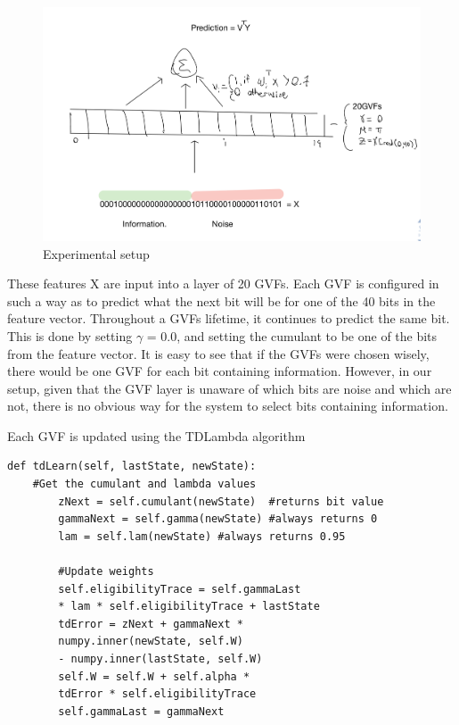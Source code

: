 \documentclass[letterpaper]{article}
\begin{document}
\begin{figure}[H]
  \centerline{\includegraphics[width=\linewidth]{Images/ExperimentSetup.png}}
  \caption{Experimental setup}
  \label{fig:experiment}
\end{figure}

These features X are input into a layer of 20 GVFs. Each GVF is configured in such a way as to predict what the next bit will be for one of the 40 bits in the feature vector. Throughout a GVFs lifetime, it continues to predict the same bit. This is done by setting $\gamma$ = 0.0, and setting the cumulant to be one of the bits from the feature vector. It is easy to see that if the GVFs were chosen wisely, there would be one GVF for each bit containing information. However, in our setup, given that the GVF layer is unaware of which bits are noise and which are not, there is no obvious way for the system to select bits containing information.

Each GVF is updated using the TDLambda algorithm

\begin{lstlisting}
def tdLearn(self, lastState, newState):
	#Get the cumulant and lambda values
        zNext = self.cumulant(newState)  #returns bit value
        gammaNext = self.gamma(newState) #always returns 0
        lam = self.lam(newState) #always returns 0.95

        #Update weights
        self.eligibilityTrace = self.gammaLast 
        * lam * self.eligibilityTrace + lastState
        tdError = zNext + gammaNext * 
        numpy.inner(newState, self.W) 
        - numpy.inner(lastState, self.W)
        self.W = self.W + self.alpha * 
        tdError * self.eligibilityTrace
        self.gammaLast = gammaNext
\end{lstlisting}
\end{document}
